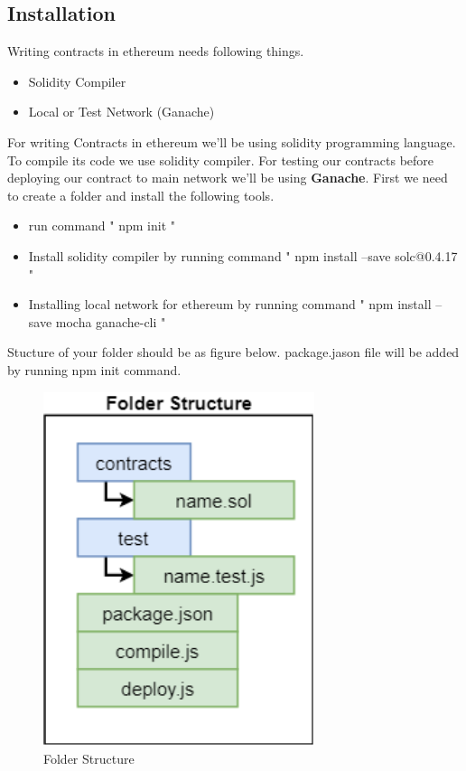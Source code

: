 \subsection{Installation}
Writing contracts in ethereum needs following things.
\begin{itemize}
	\item  Solidity Compiler
	\item  Local or Test Network (Ganache)
\end{itemize}

For writing Contracts in ethereum we'll be using solidity programming language. To compile its code we use solidity compiler. For testing our contracts before deploying our contract to main network we'll be using \textbf{Ganache}.
\newpage 
First we need to create a folder and install the following tools.
\begin{itemize}
	\item  run command " npm init "
	\item  Install solidity compiler by running command " npm install --save solc@0.4.17 "
	\item  Installing local network for ethereum by running command  
	" npm install --save mocha ganache-cli "
\end{itemize}
Stucture of your folder should be as figure below. package.jason file will be added by running npm init command.
\begin{figure}[h]
	\centering
	\includegraphics[width=300px]{figures/Ethereum/08.png}
	\caption{Folder Structure}
	\label{fig:eth7}
\end{figure}\newpage

